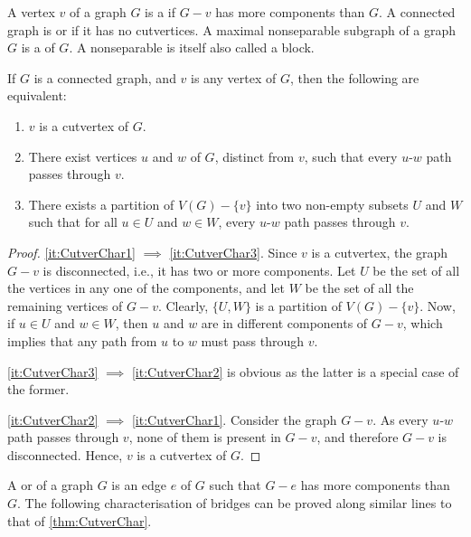 A vertex $v$ of a graph $G$ is a  if $G - v$ has more components than $G$. A connected graph is  or  if it has no cutvertices. A maximal nonseparable subgraph of a graph $G$ is a  of $G$. A nonseparable is itself also called a block.

\begin{Theorem}\label{thm:CutverChar}
If $G$ is a connected graph, and $v$ is any vertex of $G$, then the following are equivalent:
\begin{enumerate}[label=(\roman*)]
\item\label{it:CutverChar1} $v$ is a cutvertex of $G$.
\item\label{it:CutverChar2} There exist vertices $u$ and $w$ of $G$, distinct from $v$, such that every $u$-$w$ path passes through $v$.
\item\label{it:CutverChar3} There exists a partition of $V(G) - \{v\}$ into two non-empty subsets $U$ and $W$ such that for all $u \in U$ and $w \in W$, every $u$-$w$ path passes through $v$.
\end{enumerate}
\end{Theorem}

\begin{proof}
\cref{it:CutverChar1} $\implies $ \cref{it:CutverChar3}. Since $v$ is a cutvertex, the graph $G - v$ is disconnected, i.e., it has two or more components. Let $U$ be the set of all the vertices in any one of the components, and let $W$ be the set of all the remaining vertices of $G - v$. Clearly, $\{U, W\}$ is a partition of $V(G) - \{v\}$. Now, if $u \in U$ and $w \in W$, then $u$ and $w$ are in different components of $G - v$, which implies that any path from $u$ to $w$ must pass through $v$.

\noindent \cref{it:CutverChar3} $\implies$ \cref{it:CutverChar2} is obvious as the latter is a special case of the former.

\noindent \cref{it:CutverChar2} $\implies$ \cref{it:CutverChar1}. Consider the graph $G - v$. As every $u$-$w$ path passes through $v$, none of them is present in $G - v$, and therefore $G - v$ is disconnected. Hence, $v$ is a cutvertex of $G$.
\end{proof}

A  or  of a graph $G$ is an edge $e$ of $G$ such that $G - e$ has more components than $G$. The following characterisation of bridges can be proved along similar lines to that of \cref{thm:CutverChar}.

